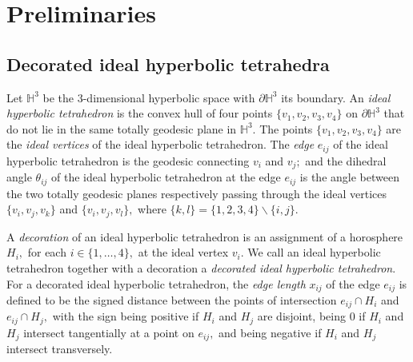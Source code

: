 \documentclass[11pt]{article}
\renewcommand{\setminus}{{\smallsetminus}}
\theoremstyle{remark}
\theoremstyle{remark}
\numberwithin{equation}{section}
\begin{document}


\section{Preliminaries}



\subsection{Decorated ideal hyperbolic tetrahedra} \label{idealtetra}


Let $\mathbb H^3$ be the $3$-dimensional hyperbolic space with  $\partial \mathbb H^3$  its boundary. An \emph{ideal hyperbolic tetrahedron} is the convex hull of four points $\{v_1,v_2,v_3,v_4\}$ on $\partial \mathbb H^3$ that do not lie in the same totally geodesic plane in $\mathbb H^3.$ The points $\{v_1,v_2,v_3,v_4\}$ are the \emph{ideal vertices} of the ideal hyperbolic tetrahedron. The \emph{edge} $e_{ij}$ of the ideal hyperbolic tetrahedron is the geodesic connecting $v_i$ and $v_j;$ and the dihedral angle $\theta_{ij}$ of the ideal hyperbolic tetrahedron at the edge $e_{ij}$ is the angle between the two totally geodesic planes respectively passing through the ideal vertices $\{v_i,v_j,v_k\}$ and $\{v_i,v_j,v_l\},$ where $\{k,l\}=\{1,2,3,4\}\setminus \{i,j\}.$ 

A \emph{decoration} of an ideal hyperbolic tetrahedron is an assignment of a horosphere $H_i,$  for each $i\in\{1,\dots, 4\},$ at the ideal vertex $v_i.$ We call an ideal hyperbolic tetrahedron together with a decoration a \emph{decorated ideal hyperbolic tetrahedron}. For a decorated ideal hyperbolic tetrahedron, the \emph{edge length} $x_{ij}$ of the edge $e_{ij}$ is defined to be the signed distance between the points of intersection $e_{ij}\cap H_i$ and $e_{ij}\cap H_j,$ with the sign being positive if $H_i$ and $H_j$ are disjoint, being $0$ if $H_i$ and $H_j$ intersect tangentially at a point on $e_{ij},$ and being negative if $H_i$ and $H_j$ intersect transversely. 
\end{document}
